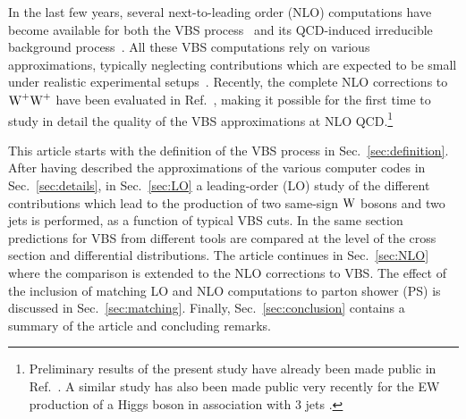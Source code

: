 In the last few years, several next-to-leading order (NLO) computations have become available for both the VBS process~\cite{Jager:2006zc,Jager:2006cp,Bozzi:2007ur,Jager:2009xx,Jager:2011ms,Denner:2012dz,Rauch:2016pai} and its QCD-induced irreducible background process~\cite{Rauch:2016pai,Melia:2010bm,Melia:2011gk,Campanario:2013gea,Baglio:2014uba}.
All these VBS computations rely on various approximations, typically neglecting contributions which are expected to be small under realistic experimental setups~\cite{Denner:2012dz,Oleari:2003tc}.
Recently, the complete NLO corrections to $\PW^+\PW^+$ have been evaluated in Ref.~\cite{Biedermann:2017bss}, 
making it possible for the first time to study in detail the quality of the VBS approximations at NLO QCD.\footnote{Preliminary results of the present study have already been made public in Ref.~\cite{Anders:2018gfr}. 
A similar study has also been made public very recently for the EW production of a Higgs boson in association with 3 jets \cite{Campanario:2018ppz}.}


\iffalse
The full gauge-invariant process including the $\PW^+\PW^+$ scattering 
 is $\Pp\Pp\to\mu^+\nu_\mu{\rm e}^+\nu_{\rm e}\,\Pj\Pj+\mathrm{X}$.
This final state receives three contributions at leading order (LO) whose coupling orders are $\mathcal{O}{\left(\alpha^{6}\right)}$, $\mathcal{O}{\left(\alpha_{\rm s}\alpha^{5}\right)}$, and $\mathcal{O}{\left(\alphas^{2}\alpha^{4}\right)}$.
They are commonly referred to as electroweak (EW), interference, and QCD contributions, respectively.%
\footnote{The EW contribution is sometimes referred to as the VBS contribution, even it involves also non-VBS contributions.}
\fi
This article starts with the definition of the VBS process in Sec.~\ref{sec:definition}.
After having described the approximations of the various computer 
codes in Sec.~\ref{sec:details}, in Sec.~\ref{sec:LO} a leading-order (LO) study 
of the different contributions which lead to the production of two same-sign $\text{W}$ bosons and 
two jets is performed, as a function of typical VBS cuts. In the same section predictions for VBS from different tools are compared at 
the level of the cross section and differential distributions. The article continues in Sec.~\ref{sec:NLO} where the comparison is extended to the
NLO corrections to VBS. The effect of the inclusion of matching LO and NLO computations to parton shower (PS) is 
discussed in Sec.~\ref{sec:matching}. Finally,
Sec.~\ref{sec:conclusion} contains a summary of the article and concluding remarks.



